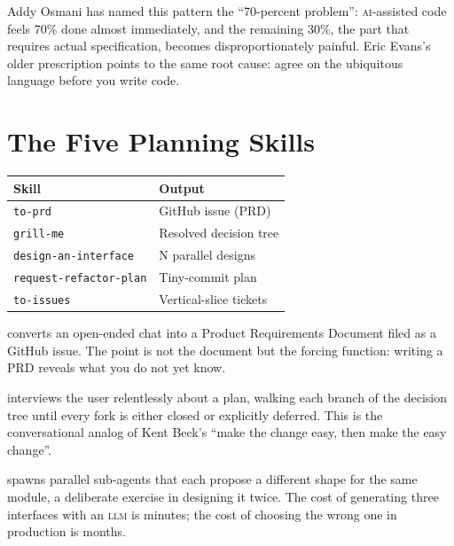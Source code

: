 \documentclass{../sharedAssets/tufte}
\begin{document}
Addy Osmani has named this pattern the ``70-percent problem'':
\textsc{ai}-assisted code feels 70\% done almost immediately, and the
remaining 30\%, the part that requires actual
specification, becomes disproportionately
painful.\cite{osmani2024seventy}
Eric Evans's older prescription points to the same root cause: agree on
the ubiquitous language before you write
code.\cite{evans2003ddd}

\section{The Five Planning Skills}
\label{sec:planning-skills}

\begin{margintable}
\caption{Planning skills in the Pocock catalogue.}
\label{tab:planning-skills}
\vspace{1em}
\begin{tabular}{ll}
\toprule
\textbf{Skill} & \textbf{Output} \\
\midrule
\texttt{to-prd}              & GitHub issue (PRD) \\
\texttt{grill-me}            & Resolved decision tree \\
\texttt{design-an-interface} & N parallel designs \\
\texttt{request-refactor-plan} & Tiny-commit plan \\
\texttt{to-issues}           & Vertical-slice tickets \\
\bottomrule
\end{tabular}
\end{margintable}

 converts an open-ended chat into a Product
Requirements Document filed as a GitHub issue. The point is not the
document but the forcing function: writing a PRD reveals what you
do not yet know.

 interviews the user relentlessly about a
plan, walking each branch of the decision tree until every fork is
either closed or explicitly deferred. This is the conversational analog
of Kent Beck's ``make the change easy, then make the easy
change''\cite{beck2024tidy}.

 spawns parallel sub-agents that
each propose a different shape for the same module, a deliberate
exercise in designing it twice. The cost of generating three
interfaces with an \textsc{llm} is minutes; the cost of choosing the
wrong one in production is months.
\end{document}
